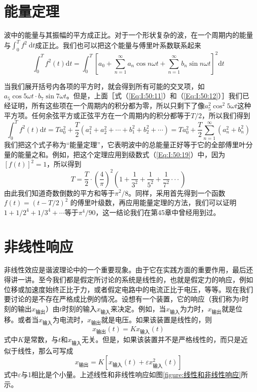 \section{能量定理}

波中的能量与其振幅的平方成正比。对于一个形状复杂的波，在一个周期内的能量与$\int_0^Tf^2~\mathrm{d}t$成正比。我们也可以把这个能量与傅里叶系数联系起来
\begin{equation}
    \label{Eq:I:50:22}
    \int_0^Tf^2\left(t\right)\mathrm{d}t=\int_0^T\left[a_0+\sum_{n=1}^\infty a_n\cos n\omega t+\sum_{n=1}^\infty b_n\sin n\omega t \right]^2\mathrm{d}t
\end{equation}

当我们展开括号内各项的平方时，就会得到所有可能的交叉项，如$a_5 \cos5\omega t\cdot b_7 \sin7\omega t$。但是，上面［式（\ref{Eq:I:50:11}）和（\ref{Eq:I:50:12}）］我们已经证明，所有这些项在一个周期内的积分都为零，所以只剩下了像$a_5^2\cos^2 5\omega t$这种平方项。任何余弦平方或正弦平方在一个周期内的积分都等于$T/2$，所以我们得到
\begin{equation}
    \label{Eq:I:50:23}
    \int_{0}^{T}f^{2}\left(t\right)\mathrm{d}t= Ta_{0}^{2}+\frac{T}{2}(a_{1}^{2}+a_{2}^{2}+\cdots+b_{1}^{2}+b_{2}^{2}+\cdots) = Ta_{0}^{2}+\frac{T}{2}\sum_{n=1}^{\infty}(a_{n}^{2}+b_{n}^{2})
\end{equation}
我们把这个式子称为“能量定理”，它表明波中的总能量正好等于它的全部傅里叶分量的能量之和。例如，把这个定理应用到级数式（\ref{Eq:I:50:19}）中，因为$[f(t)]^2=1$，所以得到
\begin{equation*}
    T=\frac{T}{2}\cdot\left(\frac{4}{\pi}\right)^{2}\left(1+\frac{1}{3^{2}}+\frac{1}{5^{2}}+\frac{1}{7^{2}}\cdotp\cdotp\cdotp\right)
\end{equation*}
由此我们知道奇数倒数的平方和等于$\pi^2 /8$。同样，采用首先得到一个函数$f(t)=(t-T/2)^2$ 的傅里叶级数，再应用能量定理的方法，我们可以证明$1+1/2^4 +1/3^4 +\cdots$等于$\pi^4/90$，这一结论我们在第45章中曾经用到过。

\section{非线性响应}
非线性效应是谐波理论中的一个重要现象。由于它在实践方面的重要作用，最后还得讲一讲。至今我们都是假定所讨论的系统是线性的，也就是假定力的响应，例如位移或加速度始终正比于力，或者假定电路中的电流正比于电压，等等。现在我们要讨论的是不存在严格成比例的情况。设想有一个装置，它的响应（我们称为$t$时刻的输出$x_\text{输出}$）由$t$时刻的输入$x_\text{输入}$来决定。例如，当$x_\text{输入}$为力时，$x_\text{输出}$就是位移。或者当$x_\text{输入}$为电流时，$x_\text{输出}$就是电压。如果该装置是线性的，则
\begin{equation}
    \label{Eq:I:50:24}
    x_\text{输出}(t) = Kx_\text{输入}(t)
\end{equation}
式中$K$是常数，与$t$和$x_\text{输入}$无关。但是，如果该装置并不是严格线性的，而只是近似于线性，那么可写成
\begin{equation}
    \label{Eq:I:50:25}
    x_\text{输出} = K\left[x_\text{输入}(t) + \varepsilon x_\text{输入}^2(t)\right]
\end{equation}
式中$\varepsilon$与1相比是个小量。上述线性和非线性响应如图\ref{figure:线性和非线性响应}所示。

